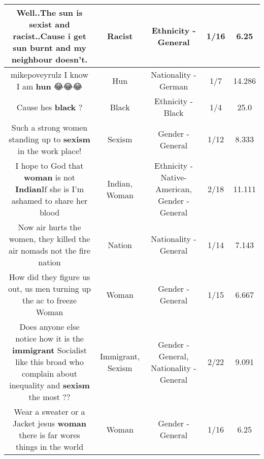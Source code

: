 \documentclass[11pt]{article}
\newlength\mylength
\begin{document}
\begin{center}
\begin{longtable}{|C{.65\mylength}|C{.30\mylength}|C{.12\mylength}|C{.12\mylength}|C{.12\mylength}|}
  \small Well..The sun is sexist and \textbf{racist}..Cause i get sun burnt and my neighbour doesn't.\normalsize   & Racist & Ethnicity - General & 1/16 & 6.25 \\  \hline
  \small mikepoveyrulz I know I am \textbf{hun} 😂😂😂\normalsize   & Hun & Nationality - German & 1/7 & 14.286 \\  \hline
  \small Cause hes \textbf{black} ?\normalsize   & Black & Ethnicity - Black & 1/4 & 25.0 \\  \hline
  \small Such a strong women standing up to \textbf{sexism} in the work place!\normalsize   & Sexism & Gender - General & 1/12 & 8.333 \\  \hline
  \small I hope to God that \textbf{woman} is not \textbf{Indian}If she is I'm ashamed to share her blood\normalsize   & Indian, Woman & Ethnicity - Native-American, Gender - General & 2/18 & 11.111 \\  \hline
  \small Now air hurts the women, they killed the air nomads not the fire nation\normalsize   & Nation & Nationality - General & 1/14 & 7.143 \\  \hline
  \small How did they figure us out, us men turning up the ac to freeze Woman\normalsize   & Woman & Gender - General & 1/15 & 6.667 \\  \hline
  \small Does anyone else notice how it is the \textbf{immigrant} Socialist like this broad who complain about inequality and \textbf{sexism} the most ??\normalsize   & Immigrant, Sexism & Gender - General, Nationality - General & 2/22 & 9.091 \\  \hline
  \small Wear a sweater or a Jacket jesus \textbf{woman} there is far wores things in the world\normalsize   & Woman & Gender - General & 1/16 & 6.25 \\  \hline

\end{longtable}
\end{center}
\end{document}

